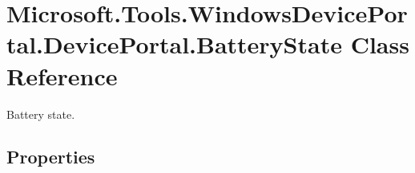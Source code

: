 \hypertarget{class_microsoft_1_1_tools_1_1_windows_device_portal_1_1_device_portal_1_1_battery_state}{}\section{Microsoft.\+Tools.\+Windows\+Device\+Portal.\+Device\+Portal.\+Battery\+State Class Reference}
\label{class_microsoft_1_1_tools_1_1_windows_device_portal_1_1_device_portal_1_1_battery_state}


Battery state.  


\subsection*{Properties}
